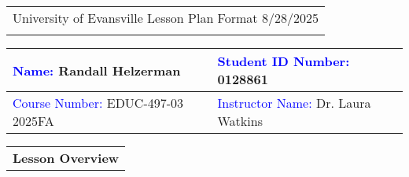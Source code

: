 \begin{tabularx}{\textwidth}{Y}
  {\large University of Evansville Lesson Plan Format 8/28/2025} \\
   \hline \\
\end{tabularx}


\begin{tabularx}{\textwidth}{|X|X|}
  \hline 
  \textcolor{blue}{Name:} Randall Helzerman         &   \textcolor{blue}{Student ID Number:} 0128861 \\
  \hline 
  \textcolor{blue}{Course Number:} EDUC-497-03 2025FA &   \textcolor{blue}{Instructor Name:} Dr. Laura Watkins\\
  \hline 
\end{tabularx}

\vskip 10pt
  
\begin{tabularx}{\textwidth}{Y}
  {\bf Lesson Overview} \\
\end{tabularx}


